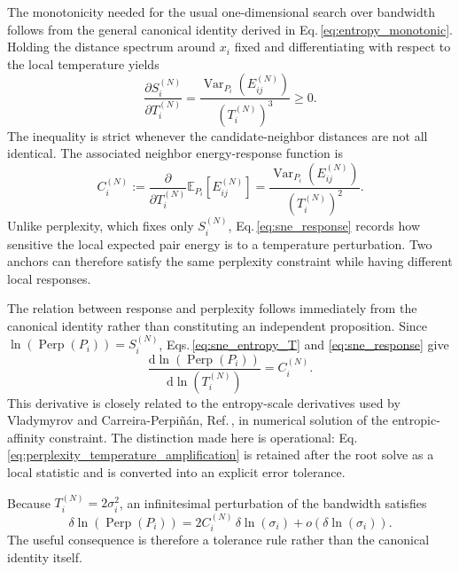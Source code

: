 \documentclass[11pt,a4paper]{article}
\newcommand{\Var}{\operatorname{Var}}
\newcommand{\Perp}{\operatorname{Perp}}
\theoremstyle{definition}
\theoremstyle{plain}
\begin{document}
The monotonicity needed for the usual one-dimensional search over bandwidth follows from the general canonical identity derived in Eq.\,\eqref{eq:entropy_monotonic}. Holding the distance spectrum around $x_i$ fixed and differentiating with respect to the local temperature yields
\begin{equation}
    \frac{\partial S_i^{(N)}}{\partial T_i^{(N)}}
    =\frac{\Var_{P_i}(E_{ij}^{(N)})}{(T_i^{(N)})^3}
    \ge0.
    \label{eq:sne_entropy_T}
\end{equation}
The inequality is strict whenever the candidate-neighbor distances are not all identical. The associated neighbor energy-response function is
\begin{equation}
    C_i^{(N)}
    :=\frac{\partial}{\partial T_i^{(N)}}
    \mathbb{E}_{P_i}\!\left[E_{ij}^{(N)}\right]
    =\frac{\Var_{P_i}(E_{ij}^{(N)})}{(T_i^{(N)})^2}.
    \label{eq:sne_response}
\end{equation}
Unlike perplexity, which fixes only $S_i^{(N)}$, Eq.\,\eqref{eq:sne_response} records how sensitive the local expected pair energy is to a temperature perturbation. Two anchors can therefore satisfy the same perplexity constraint while having different local responses.

The relation between response and perplexity follows immediately from the canonical identity rather than constituting an independent proposition. Since $\ln\left(\Perp(P_i)\right)=S_i^{(N)}$, Eqs.\,\eqref{eq:sne_entropy_T} and \eqref{eq:sne_response} give
\begin{equation}
    \frac{\mathrm{d}\ln\left(\Perp(P_i)\right)}{\mathrm{d}\ln\left(T_i^{(N)}\right)}
    = C_i^{(N)}.
    \label{eq:perplexity_temperature_amplification}
\end{equation}
This derivative is closely related to the entropy-scale derivatives used by Vladymyrov and Carreira-Perpi\~n\'an, Ref.\,\cite{vladymyrov2013entropic}, in numerical solution of the entropic-affinity constraint. The distinction made here is operational: Eq.\,\eqref{eq:perplexity_temperature_amplification} is retained after the root solve as a local statistic and is converted into an explicit error tolerance.

Because $T_i^{(N)}=2\sigma_i^2$, an infinitesimal perturbation of the bandwidth satisfies
\begin{equation}
    \delta\ln\left(\Perp(P_i)\right)
    =2C_i^{(N)}\,\delta\ln\left(\sigma_i\right)
      +o\!\left(\delta\ln\left(\sigma_i\right)\right).
    \label{eq:perplexity_sigma_error}
\end{equation}
The useful consequence is therefore a tolerance rule rather than the canonical identity itself.
\end{document}
